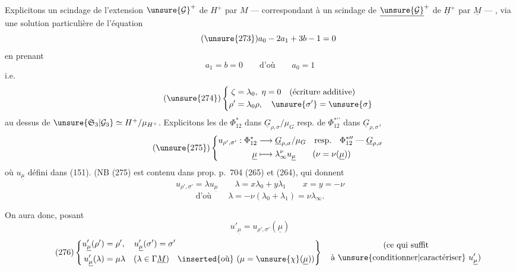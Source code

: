 
Explicitons un scindage de l'extension
$\unsure{\mathcal G}^+$ de $H^+$ par $M$
--- correspondant à un scindage de
$\underline{\unsure{\mathcal G}}^+$ de $\underline H^+$
par $\underline M$ --- , via une solution particulière de l'équation
\[
\tag{\unsure{273}}
a_0-2a_1+3b-1=0
\]
en prenant
\[
a_1=b=0\qquad\text{d'où}\qquad a_0=1
\]
i.e.
\[
\tag{\unsure{274}}
\left\{\begin{aligned}
\zeta&=\lambda_0,\ \eta=0\quad\text{(écriture additive)}\\
\rho'&=\lambda_0\rho,\quad\unsure{\sigma'}=\unsure{\sigma}
\end{aligned}\right.
\]
au dessus de $\unsure{\mathfrak S_3|\mathcal G_3}
\simeq H^+/\mu_{H^+}$.
Explicitons les 
 de $\Phi_{12}^*$ dans
$\underline G_{\rho,\sigma}/\mu_G$ resp. de
$\Phi_{12}^{*\prime\prime}$ dans $\underline G_{\rho,\sigma}$\unsure{;},
\[
\tag{\unsure{275}}
\left\{\begin{aligned}
u_{\rho',\sigma'}:\Phi_{12}^*&\longrightarrow
\underline G_{\rho,\sigma}/\mu_G
\quad\text{resp.}\quad\Phi_{12}^{*\prime\prime}
\mathrel{\text{---}}\underline G_{\rho,\sigma}
\\
\underline\mu&\longmapsto\lambda_\infty^{\nu}u_{\underline\mu}
\qquad(\nu=\nu(\underline\mu))
\end{aligned}\right.
\]
où $u_{\underline\mu}$ défini dans (151).
(NB\unsure{\S} (275) est contenu dans prop. p.~704
(265) et (264), qui donnent
\[
u_{\rho',\sigma'}=\lambda u_{\underline\mu}\qquad
\lambda=x\lambda_0+y\lambda_1\qquad x=y=-\nu
\]
\[
\text{d'où}\qquad\lambda=-\nu(\lambda_0+\lambda_1)=\nu\lambda_\infty.
\]

On aura donc, posant
\[
u'_{\underline\mu}=u_{\rho',\sigma'}(\underline\mu)
\]
\[
\tag{276}
\left\{\begin{aligned}
u'_{\underline\mu}(\rho')&=\rho',\quad
u'_{\underline\mu}(\sigma')=\sigma'\\
u'_{\underline\mu}(\lambda)&=\mu\lambda\quad
(\lambda\in\Gamma\underline M)
\quad\inserted{\text{où}}\ (\mu=\unsure{\chi}(\underline\mu))
\end{aligned}\right\}
\quad\begin{gathered}
\text{(ce qui suffit}\\
\text{à \unsure{conditionner|caractériser}}\ u'_{\underline\mu})
\end{gathered}
\]

